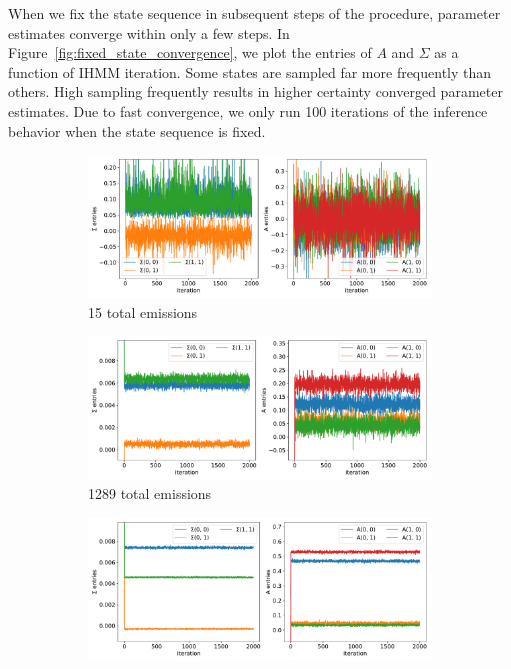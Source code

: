 \documentclass{article}
\begin{document}
  \clearpage
  
  When we fix the state sequence in subsequent steps of the procedure, parameter 
  estimates converge within only a few steps. In Figure~\ref{fig:fixed_state_convergence}, we 
  plot the entries of $A$ and $\Sigma$ as a function of IHMM iteration. Some states
  are sampled far more frequently than others. High sampling frequently results in
  higher certainty converged parameter estimates. Due to fast convergence, we only
  run 100 iterations of the inference behavior when the state sequence is fixed.
  
  \begin{figure}[h]
  \centering
  \begin{subfigure}{0.6\textwidth}
  \includegraphics[width=\textwidth]{convergence_MET_4.pdf}
  \caption{15 total emissions}\label{fig:convergence_MET_low}
  \end{subfigure}
  \begin{subfigure}{0.6\textwidth}
  \includegraphics[width=\textwidth]{convergence_MET_21.pdf}
  \caption{1289 total emissions}\label{fig:convergence_MET_medium}
  \end{subfigure}
  \begin{subfigure}{0.6\textwidth}
  \includegraphics[width=\textwidth]{convergence_MET_15.pdf}

\end{subfigure}
\end{figure}
\end{document}
